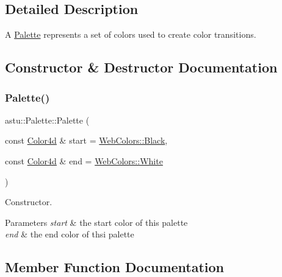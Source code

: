\subsection{Detailed Description}
A \hyperlink{classastu_1_1Palette}{Palette} represents a set of colors used to create color transitions. 

\subsection{Constructor \& Destructor Documentation}
\mbox{\label{classastu_1_1Palette_af3a2786903a43f82307b4e47a424cc38}} 
\subsubsection{\texorpdfstring{Palette()}{Palette()}}
{\footnotesize\ttfamily astu\+::\+Palette\+::\+Palette (\begin{DoxyParamCaption}\item[{const \hyperlink{classastu_1_1Color}{Color4d} \&}]{start = {\ttfamily \hyperlink{classastu_1_1WebColors_ac75482e858498b1b3fa521ba93fcda98a915454255bdc03ff9d0fadee51ba3d50}{Web\+Colors\+::\+Black}},  }\item[{const \hyperlink{classastu_1_1Color}{Color4d} \&}]{end = {\ttfamily \hyperlink{classastu_1_1WebColors_ac75482e858498b1b3fa521ba93fcda98acc916d617a3ce8d3e4b9716bbdc231e5}{Web\+Colors\+::\+White}} }\end{DoxyParamCaption})}

Constructor.


\begin{DoxyParams}{Parameters}
{\em start} & the start color of this palette \\
\hline
{\em end} & the end color of thsi palette \\
\hline
\end{DoxyParams}


\subsection{Member Function Documentation}
\mbox{\label{classastu_1_1Palette_a742c7531ae21206738af971d1987cb36}} 
